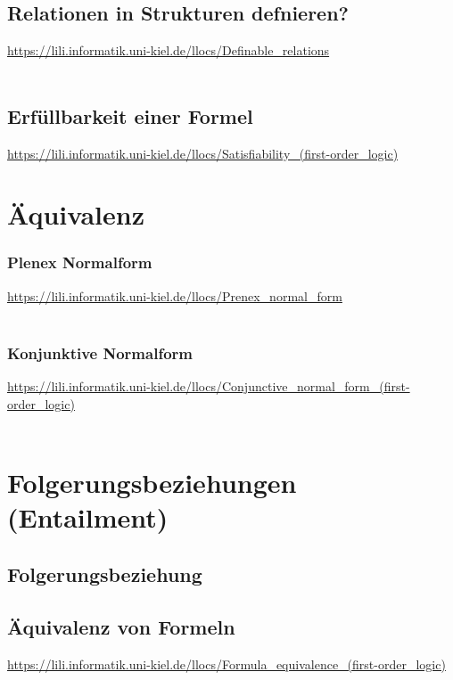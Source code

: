 \documentclass[twocolumn]{article}
\begin{document}
    \subsection{Relationen in Strukturen defnieren?}
    \url{https://lili.informatik.uni-kiel.de/llocs/Definable_relations}\\\\

    \subsection{Erfüllbarkeit einer Formel}
    \url{https://lili.informatik.uni-kiel.de/llocs/Satisfiability_(first-order_logic)}\\

    \section{Äquivalenz}

    \subsubsection{Plenex Normalform}
    \url{https://lili.informatik.uni-kiel.de/llocs/Prenex_normal_form}\\\\

    \subsubsection{Konjunktive Normalform}
    \url{https://lili.informatik.uni-kiel.de/llocs/Conjunctive_normal_form_(first-order_logic)}\\\\

    \section{Folgerungsbeziehungen (Entailment)}

    \subsection{Folgerungsbeziehung}\subsection{Äquivalenz von Formeln}
    \url{https://lili.informatik.uni-kiel.de/llocs/Formula_equivalence_(first-order_logic)}\\\\
\end{document}
